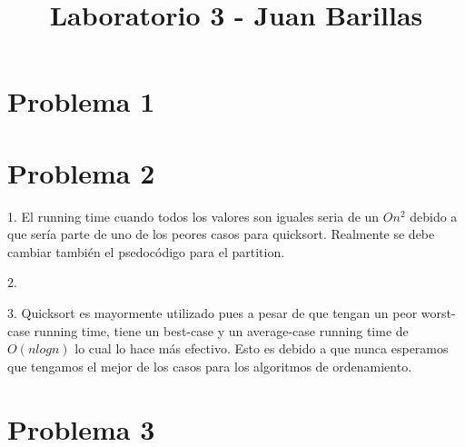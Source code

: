 \documentclass{article}
\begin{document}
	\title{Laboratorio 3 - Juan Barillas}
	\maketitle
\section{Problema 1}
\section{Problema 2}
1. El running time cuando todos los valores son iguales seria de un $On^2$ debido a que sería parte de uno de los peores casos para quicksort. Realmente se debe cambiar también el psedocódigo para el partition.

2. 

3. Quicksort es mayormente utilizado pues a pesar de que tengan un peor worst-case running time, tiene un best-case y un average-case running time de $O(nlogn)$ lo cual lo hace más efectivo. Esto es debido a que nunca esperamos que tengamos el mejor de los casos para los algoritmos de ordenamiento.
\section{Problema 3}
	
	
	
	
\end{document}
